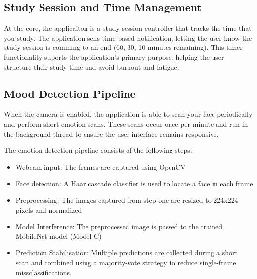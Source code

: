 \documentclass[12pt,a4paper]{article}
\begin{document}
\subsection{Study Session and Time Management}
At the core, the applicaiton is a study session controller that tracks the time that you study. The application sens time-based notification, letting the user know the study session is comming to an end (60, 30, 10 minutes remaining). This timer functionality suports the application's primary purpose: helping the user structure their study time and avoid burnout and fatigue.

\subsection{Mood Detection Pipeline}
When the camera is enabled, the application is able to scan your face periodically and perform short emotion scans. These scans occur once per minute and run in the background thread to ensure the user interface remains responsive.

The emotion detection pipeline consists of the following steps:
\begin{itemize}
\item Webcam input: The frames are captured using OpenCV
\item Face detection: A Haar cascade classifier is used to locate a face in each frame
\item Preprocessing: The images captured from step one are resized to 224x224 pixels and normalized
\item Model Interference: The preprocessed image is passed to the trained MobileNet model (Model C)
\item Prediction Stabilisation: Multiple predictions are collected during a short scan and combined using a majority-vote strategy to reduce single-frame missclassifications.
\end{itemize}
 
\end{document}
